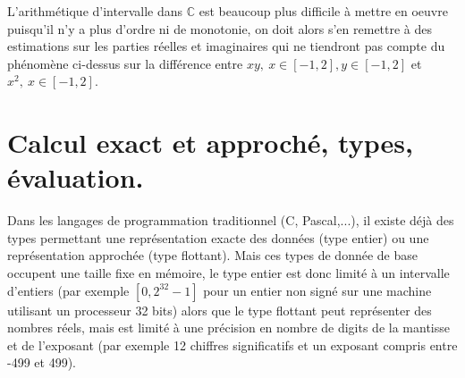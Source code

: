 \documentclass[a4paper,11pt]{book}
\begin{document}
\begin{giacjshere}
L'arithm\'etique d'intervalle dans $\mathbb{C}$ est beaucoup plus difficile
\`a mettre en oeuvre puisqu'il n'y a plus d'ordre ni de monotonie,
on doit alors s'en remettre \`a des estimations sur les parties
r\'eelles et imaginaires qui ne tiendront pas compte du ph\'enom\`ene
ci-dessus sur la diff\'erence entre $xy, \ x \in [-1,2], y \in [-1,2]$
et $x^2, \ x \in [-1,2]$.


\section{Calcul exact et approché, types, évaluation.}
Dans les langages de programmation traditionnel (C, Pascal,...), il existe 
déjà des types permettant une représentation 
exacte des données (type entier) ou une représentation approchée 
(type flottant). Mais ces types de donnée de base 
occupent une taille fixe en mémoire, le type entier est donc
limité à un intervalle d'entiers (par exemple $[0,2^{32}-1]$ pour un entier
non signé sur une machine utilisant un processeur 32 bits) alors que le 
type flottant peut représenter des nombres réels, mais est 
limité à une précision en nombre de digits de la mantisse et de l'exposant 
(par exemple 12 chiffres significatifs et un 
exposant compris entre -499 et 499). 


\end{giacjshere}
\end{document}
